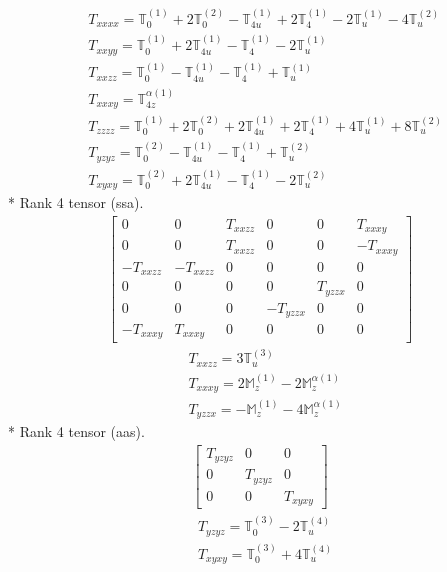 \documentclass[fleqn,8pt,landscape]{jsarticle}
\begin{document}
\begin{align*}
& T_{xxxx} = \mathbb{T}_{0}^{(1)} + 2 \mathbb{T}_{0}^{(2)} - \mathbb{T}_{4u}^{(1)} + 2 \mathbb{T}_{4}^{(1)} - 2 \mathbb{T}_{u}^{(1)} - 4 \mathbb{T}_{u}^{(2)} \\
& T_{xxyy} = \mathbb{T}_{0}^{(1)} + 2 \mathbb{T}_{4u}^{(1)} - \mathbb{T}_{4}^{(1)} - 2 \mathbb{T}_{u}^{(1)} \\
& T_{xxzz} = \mathbb{T}_{0}^{(1)} - \mathbb{T}_{4u}^{(1)} - \mathbb{T}_{4}^{(1)} + \mathbb{T}_{u}^{(1)} \\
& T_{xxxy} = \mathbb{T}_{4z}^{\alpha(1)} \\
& T_{zzzz} = \mathbb{T}_{0}^{(1)} + 2 \mathbb{T}_{0}^{(2)} + 2 \mathbb{T}_{4u}^{(1)} + 2 \mathbb{T}_{4}^{(1)} + 4 \mathbb{T}_{u}^{(1)} + 8 \mathbb{T}_{u}^{(2)} \\
& T_{yzyz} = \mathbb{T}_{0}^{(2)} - \mathbb{T}_{4u}^{(1)} - \mathbb{T}_{4}^{(1)} + \mathbb{T}_{u}^{(2)} \\
& T_{xyxy} = \mathbb{T}_{0}^{(2)} + 2 \mathbb{T}_{4u}^{(1)} - \mathbb{T}_{4}^{(1)} - 2 \mathbb{T}_{u}^{(2)}
\end{align*}
* Rank 4 tensor (ssa).
\begin{align*}
\begin{bmatrix} 0 & 0 & T_{xxzz} & 0 & 0 & T_{xxxy} \\ 0 & 0 & T_{xxzz} & 0 & 0 & - T_{xxxy} \\ - T_{xxzz} & - T_{xxzz} & 0 & 0 & 0 & 0 \\ 0 & 0 & 0 & 0 & T_{yzzx} & 0 \\ 0 & 0 & 0 & - T_{yzzx} & 0 & 0 \\ - T_{xxxy} & T_{xxxy} & 0 & 0 & 0 & 0 \end{bmatrix}
\end{align*}
\begin{align*}
& T_{xxzz} = 3 \mathbb{T}_{u}^{(3)} \\
& T_{xxxy} = 2 \mathbb{M}_{z}^{(1)} - 2 \mathbb{M}_{z}^{\alpha(1)} \\
& T_{yzzx} = - \mathbb{M}_{z}^{(1)} - 4 \mathbb{M}_{z}^{\alpha(1)}
\end{align*}
* Rank 4 tensor (aas).
\begin{align*}
\begin{bmatrix} T_{yzyz} & 0 & 0 \\ 0 & T_{yzyz} & 0 \\ 0 & 0 & T_{xyxy} \end{bmatrix}
\end{align*}
\begin{align*}
& T_{yzyz} = \mathbb{T}_{0}^{(3)} - 2 \mathbb{T}_{u}^{(4)} \\
& T_{xyxy} = \mathbb{T}_{0}^{(3)} + 4 \mathbb{T}_{u}^{(4)}
\end{align*}
\end{document}
